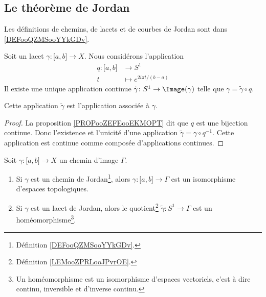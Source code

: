 


\subsection{Le théorème de Jordan}

Les définitions de chemins, de lacets et de courbes de Jordan sont dans \ref{DEFooQZMSooYYkGDv}.

\begin{lemmaDef}     \label{LEMooZPRLooJPvrOE}
	Soit un lacet \( \gamma\colon \mathopen[ a , b \mathclose]\to X\). Nous considérons l'application
	\begin{equation}
		\begin{aligned}
			q\colon \mathopen[ a , b \mathclose] & \to S^1                    \\
			t                                    & \mapsto  e^{2i\pi t/(b-a)}
		\end{aligned}
	\end{equation}
	Il existe une unique application continue \( \tilde \gamma\colon S^1\to \Image(\gamma)\) telle que \( \gamma=\tilde \gamma\circ q\).

	Cette application \( \tilde \gamma\) est l'application  associée à \( \gamma\).
\end{lemmaDef}

\begin{proof}
	La proposition \ref{PROPooZEFEooEKMOPT} dit que \( q\) est une bijection continue. Donc l'existence et l'unicité d'une application \( \tilde \gamma=\gamma\circ q^{-1}\). Cette application est continue comme composée d'applications continues.
\end{proof}

\begin{lemma}     \label{LEMooCGVOooVPlSRD}
	Soit \( \gamma\colon \mathopen[ a , b \mathclose]\to X\) un chemin d'image \( \Gamma\).
	\begin{enumerate}
		\item       \label{ITEMooWKVAooCQDvpL}
		      Si \( \gamma\) est un chemin de Jordan\footnote{Définition \ref{DEFooQZMSooYYkGDv}.}, alors \( \gamma\colon \mathopen[ a , b \mathclose]\to \Gamma\) est un isomorphisme d'espaces topologiques.
		\item       \label{ITEMooVYMXooEtgPJT}
		      Si \( \gamma\) est un lacet de Jordan, alors le quotient\footnote{Définition \ref{LEMooZPRLooJPvrOE}.} \( \tilde \gamma\colon S^1\to \Gamma\) est un homéomorphisme\footnote{Un homéomorphisme est un isomorphisme d'espaces vectoriels, c'est à dire continu, inversible et d'inverse continu.}.
	\end{enumerate}
\end{lemma}

